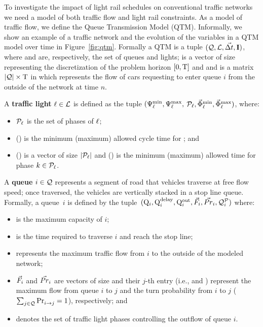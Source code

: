 To investigate the impact of light rail schedules on conventional
traffic networks we need a model of both traffic flow and light rail
constraints.  As a model of traffic flow, we define the Queue
Transmission Model (QTM).  Informally, we show an example of a traffic
network and the evolution of the variables in a QTM model over time
in Figure~\ref{fig:qtm}.  Formally a QTM is a tuple $(\mathcal{Q}, \mathcal{L},
\vec{\Delta t}, \mathbf{I})$, where \Qset and \Lset are, respectively, the set of
queues and lights;
%
\vecDT is a vector of size \Nn representing the discretization of the problem
horizon $[0,\mathrm{T}]$ and 
%
%
and \MatQIN is a matrix $|\mathcal{Q}| \times \mathrm{T}$ in which  represents
the flow of cars requesting to enter queue $i$ from the outside of the network
at time $n$.



A \textbf{traffic light} $\ell \in \mathcal{L}$ is defined as the tuple $(\mathrm{\Psi}_{\ell}^{\mathrm{min}},
\mathrm{\Psi}_{\ell}^{\mathrm{max}},$ $\mathcal{P}_\ell, \vec{\mathrm{\Phi}}_{\ell}^{\mathrm{min}}, \vec{\mathrm{\Phi}}_{\ell}^{\mathrm{max}})$, where:
%
\begin{itemize}
%
\item $\mathcal{P}_\ell$ is the set of phases of $\ell$;
%
\item \CTMIN{\tl} (\CTMAX{\tl}) is the minimum (maximum) allowed cycle time for
\tl; and
%
\item \VecPTMIN{\tl} (\VecPTMAX{\tl}) is a vector of size $|\mathcal{P}_\ell|$ and
   () is the minimum (maximum) allowed time for
  phase $k \in \mathcal{P}_\ell$. 
%
\end{itemize}


A \textbf{queue} $i \in \mathcal{Q}$ represents a segment of road that vehicles
traverse at free flow speed; once traversed, the vehicles are vertically stacked
in a stop line queue.
%
Formally, a queue~$i$ is defined by the tuple~$(\mathrm{Q}_{i}, \mathrm{Q}_{i}^{\mathrm{delay}}, \mathrm{Q}_{i}^{\mathrm{out}},
\vec{F}_i, \vec{Pr}_i, \mathcal{Q}_{i}^{\mathcal{P}})$ where:
%
\begin{itemize}
%
\item {} is the maximum capacity of $i$;
%
\item {} is the time required to traverse $i$ and reach the stop line;
%
\item {} represents the maximum traffic flow from $i$ to the outside of
  the modeled network;
%
\item $\vec{F}_i$ and $\vec{Pr}_i$ are vectors of size \Qn and their $j$-th entry
  (i.e.,  and ) represent the maximum flow from queue $i$
  to $j$ and the turn probability from $i$ to $j$ ($\sum_{j \in
  \mathcal{Q}}\mathrm{Pr}_{i\to j}^{\mathrm{}} = 1$), respectively; and
%
\item {} denotes the set of traffic light phases controlling the outflow
  of queue $i$.
%
\end{itemize}


